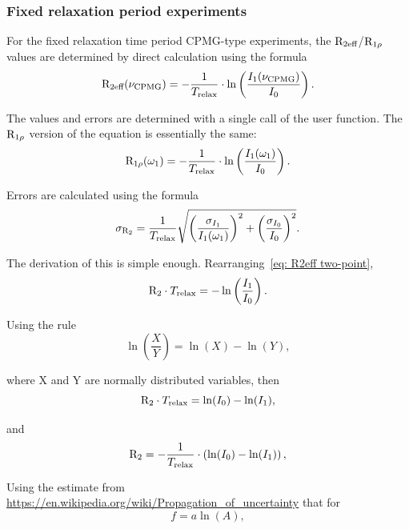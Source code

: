 \subsubsection{Fixed relaxation period experiments}

For the fixed relaxation time period CPMG-type experiments, the $\mathrm{R}_{\textrm{2eff}}$/$\mathrm{R}_{1\rho}$ values are determined by direct calculation using the formula
\begin{equation} \label{eq: R2eff two-point}
    \mathrm{R}_{\textrm{2eff}}(\nu_{\textrm{CPMG}}) = - \frac{1}{T_{\textrm{relax}}} \cdot \ln \left( \frac{I_1(\nu_{\textrm{CPMG}})}{I_0} \right) .
\end{equation}

The values and errors are determined with a single call of the  user function.
The $\mathrm{R}_{1\rho}$ version of the equation is essentially the same:
\begin{equation}
    \mathrm{R}_{1\rho}(\omega_1) = - \frac{1}{T_{\textrm{relax}}} \cdot \ln \left( \frac{I_1(\omega_1)}{I_0} \right) .
\end{equation}

Errors are calculated using the formula
\begin{equation} \label{eq: dispersion error}
    \sigma_{\mathrm{R}_2} = \frac{1}{T_{\textrm{relax}}} \sqrt{ \left( \frac{\sigma_{I_1}}{I_1(\omega_1)} \right)^2  +  \left( \frac{\sigma_{I_0}}{I_0} \right)^2 } .
\end{equation}

The derivation of this is simple enough.
Rearranging~\ref{eq: R2eff two-point},
\begin{equation}
    \mathrm{R}_2 \cdot T_{\textrm{relax}} = -\ln \left( \frac{I_1}{I_0} \right) .
\end{equation}

Using the rule
\begin{equation}
    \ln\left(\frac{X}{Y}\right) = \ln(X) - \ln(Y),
\end{equation}

where X and Y are normally distributed variables, then
\begin{equation}
    \mathrm{R}_2 \cdot T_{\textrm{relax}} = \ln(I_0) - \ln(I_1) ,
\end{equation}

and
\begin{equation}
    \mathrm{R}_2 = - \frac{1}{T_{\textrm{relax}}} \cdot \left( \ln(I_0) - \ln(I_1) \right) ,
\end{equation}

Using the estimate from \url{https://en.wikipedia.org/wiki/Propagation_of_uncertainty} that for
\begin{equation}
    f = a \ln(A),
\end{equation}


